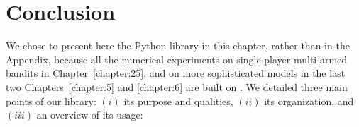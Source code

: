 \section{Conclusion}
\label{sec:3:conclusion}


We chose to present here the Python library \SMPyBandits{} in this chapter, rather than in the Appendix, because all the numerical experiments on single-player multi-armed bandits in Chapter~\ref{chapter:25}, and on more sophisticated models in the last two Chapters~\ref{chapter:5} and \ref{chapter:6} are built on \SMPyBandits.
%
We detailed three main points of our library:
$(i)$ its purpose and qualities,
$(ii)$ its organization,
and $(iii)$ an overview of its usage:
%

